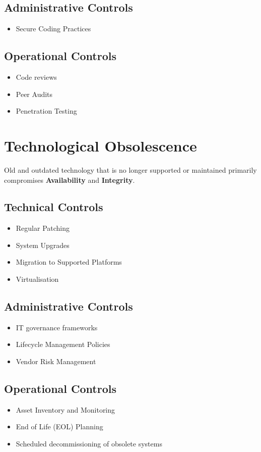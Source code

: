 \documentclass[12pt letter]{report}
\begin{document}
\subsection{Administrative Controls}
\begin{itemize}
  \item Secure Coding Practices
\end{itemize}

\subsection{Operational Controls}
\begin{itemize}
  \item Code reviews
  \item Peer Audits
  \item Penetration Testing
\end{itemize}

\section{Technological Obsolescence}

Old and outdated technology that is no longer supported or maintained
primarily compromises \textbf{Availability} and \textbf{Integrity}.

\subsection{Technical Controls}
\begin{itemize}
  \item Regular Patching
  \item System Upgrades
  \item Migration to Supported Platforms
  \item  Virtualisation
\end{itemize}

\subsection{Administrative Controls}
\begin{itemize}
  \item IT governance frameworks
  \item Lifecycle Management Policies
  \item Vendor Risk Management
\end{itemize}

\subsection{Operational Controls}
\begin{itemize}
  \item Asset Inventory and Monitoring
  \item End of Life (EOL) Planning
  \item Scheduled decommissioning of obsolete systems
\end{itemize}
\end{document}
